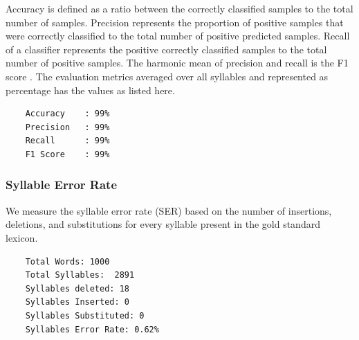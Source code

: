 \documentclass{ieeeaccess}
\begin{document}
Accuracy is defined as a ratio between the correctly classified samples to the total number of samples. Precision  represents the proportion of positive samples that were correctly classified to the total number of positive predicted samples. Recall  of a classifier represents the positive correctly classified samples to the total number of positive samples. The harmonic mean of precision and recall is the F1 score \cite{tharwat2020classification}. The evaluation metrics averaged over all syllables and represented as percentage has the values as listed here.




\begin{lstlisting}
	Accuracy	: 99%
	Precision	: 99%
	Recall		: 99%
	F1 Score	: 99%
\end{lstlisting}

\subsubsection{Syllable Error Rate}

We measure the syllable error rate (SER) based on the number of insertions, deletions, and substitutions for every syllable present in the gold standard lexicon.


\begin{lstlisting}
	Total Words: 1000
	Total Syllables:  2891
	Syllables deleted: 18
	Syllables Inserted: 0
	Syllables Substituted: 0
	Syllables Error Rate: 0.62%
\end{lstlisting}
\end{document}

